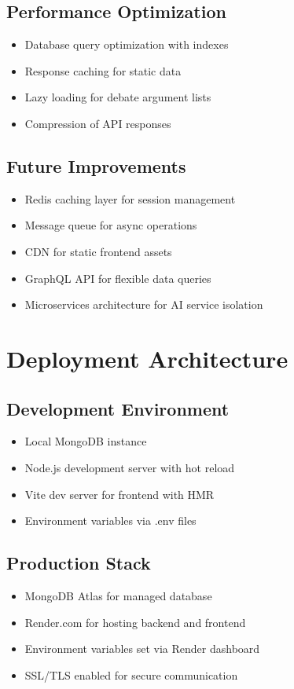 \subsection{Performance Optimization}
\begin{itemize}
    \item Database query optimization with indexes
    \item Response caching for static data
    \item Lazy loading for debate argument lists
    \item Compression of API responses
\end{itemize}

\subsection{Future Improvements}
\begin{itemize}
    \item Redis caching layer for session management
    \item Message queue for async operations
    \item CDN for static frontend assets
    \item GraphQL API for flexible data queries
    \item Microservices architecture for AI service isolation
\end{itemize}

\section{Deployment Architecture}

\subsection{Development Environment}
\begin{itemize}
    \item Local MongoDB instance
    \item Node.js development server with hot reload
    \item Vite dev server for frontend with HMR
    \item Environment variables via .env files
\end{itemize}

\subsection{Production Stack}
\begin{itemize}
    \item MongoDB Atlas for managed database
    \item Render.com for hosting backend and frontend
    \item Environment variables set via Render dashboard
    \item SSL/TLS enabled for secure communication
\end{itemize}

